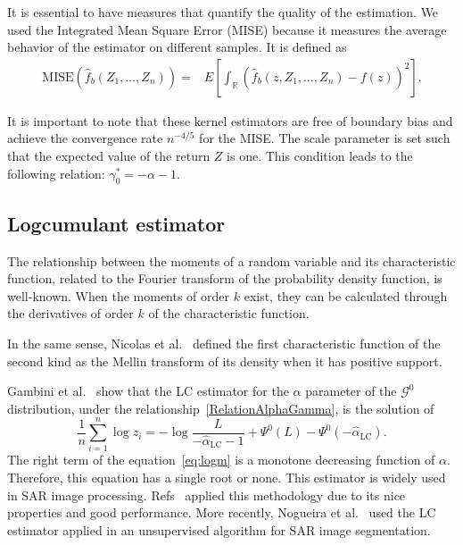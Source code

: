 \documentclass[twocolumn]{svjour3}
\begin{document}
	It is essential to have measures that quantify the quality of the estimation. 
	We used the Integrated Mean Square Error (MISE) because it measures the average behavior of the estimator on different samples. 
	It is defined as
	\begin{align}
		\label{Mise}
		\text{MISE}(\widehat{f}_b(Z_1,\ldots,Z_n))=&E\left[\int_\mathbb{R} (\widehat{f}_b(z,Z_1,\ldots,Z_n)-f(z))^2 \right].
	\end{align}
	
	It is important to note that these kernel estimators are free of boundary bias and achieve the convergence rate $n^{-4/5}$ for the MISE.
	The scale parameter is set such that the expected value of the return $Z$ is one. 
	This condition leads to the following relation: $\gamma_0^*=-\alpha-1$.
	
	\subsection{Logcumulant estimator}\label{lc}
	
	The relationship between the moments of a random variable and its characteristic function, related to the Fourier transform of the probability density function, is well-known. 
	When the moments of order $k$ exist, they can be calculated through the derivatives of order $k$ of the characteristic function.
	
	In the same sense, Nicolas et al.~\cite{nicolas2002} defined the first characteristic function of the second kind as the Mellin transform of its density when it has positive support. 
	
	Gambini et al.~\cite{gambini2015} show that the LC estimator for the $\alpha$ parameter of the $\mathcal{G}^0$ distribution, under the relationship~\eqref{RelationAlphaGamma}, is the solution of 
	\begin{equation} \label{eq:logm}
		\frac{1}{n} \sum_{i=1}^n\log z_i =   -\log \frac{L}{-\widehat\alpha_{\text{{LC}}}-1} + \Psi^0(L) - \Psi^0(-\widehat\alpha_{\text{{LC}}}).
	\end{equation}
	The right term of the equation~\eqref{eq:logm} is a monotone decreasing function of $\alpha$. Therefore, this equation has a single root or none. 
	This estimator is widely used in SAR image processing. 
	Refs~\cite{MellinAnalysisPolSAR,BujorTrouveValetNicolas2004,khan2014} applied this methodology due to its nice properties and good performance. 
	More recently, Nogueira et al.~\cite{Nogueira2019} used the LC estimator applied in an unsupervised algorithm for SAR image segmentation.
	
\end{document}
